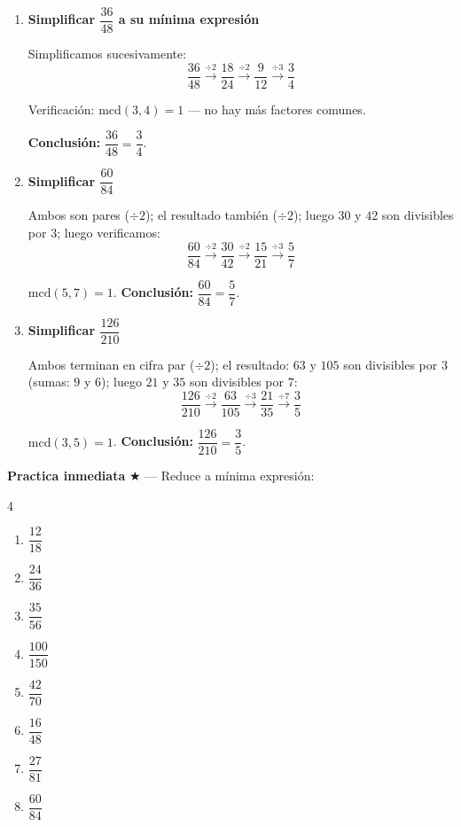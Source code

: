 \documentclass[11pt, letterpaper]{article}
\begin{document}
\begin{tcolorbox}[examplebox, title={Ejemplos --- simplificaci\'on sucesiva por primos}]
\begin{enumerate}[label=\textbf{Ej. \arabic*.}, leftmargin=*, itemsep=14pt]

\item \textbf{Simplificar $\dfrac{36}{48}$ a su m\'inima expresi\'on}

Simplificamos sucesivamente:
$$\frac{36}{48} \xrightarrow{\div 2} \frac{18}{24} \xrightarrow{\div 2} \frac{9}{12} \xrightarrow{\div 3} \frac{3}{4}$$

Verificaci\'on: $\text{mcd}(3,4)=1$ --- no hay m\'as factores comunes. \checkmark

\textbf{Conclusi\'on:} $\dfrac{36}{48} = \dfrac{3}{4}$.

\item \textbf{Simplificar $\dfrac{60}{84}$}

Ambos son pares ($\div 2$); el resultado tambi\'en ($\div 2$); luego $30$ y $42$ son divisibles por $3$; luego verificamos:
$$\frac{60}{84} \xrightarrow{\div 2} \frac{30}{42} \xrightarrow{\div 2} \frac{15}{21} \xrightarrow{\div 3} \frac{5}{7}$$

$\text{mcd}(5,7)=1$. \checkmark \quad \textbf{Conclusi\'on:} $\dfrac{60}{84} = \dfrac{5}{7}$.

\item \textbf{Simplificar $\dfrac{126}{210}$}

Ambos terminan en cifra par ($\div 2$); el resultado: $63$ y $105$ son divisibles por $3$ (sumas: $9$ y $6$); luego $21$ y $35$ son divisibles por $7$:
$$\frac{126}{210} \xrightarrow{\div 2} \frac{63}{105} \xrightarrow{\div 3} \frac{21}{35} \xrightarrow{\div 7} \frac{3}{5}$$

$\text{mcd}(3,5)=1$. \checkmark \quad \textbf{Conclusi\'on:} $\dfrac{126}{210} = \dfrac{3}{5}$.

\end{enumerate}
\end{tcolorbox}

\medskip
\textbf{Practica inmediata} \quad $\bigstar$ --- Reduce a m\'inima expresi\'on:
\begin{multicols}{4}
\begin{enumerate}[label=\alph*), leftmargin=*]
  \item $\dfrac{12}{18}$
  \item $\dfrac{24}{36}$
  \item $\dfrac{35}{56}$
  \item $\dfrac{100}{150}$
  \item $\dfrac{42}{70}$
  \item $\dfrac{16}{48}$
  \item $\dfrac{27}{81}$
  \item $\dfrac{60}{84}$
\end{enumerate}
\end{multicols}
\end{document}
